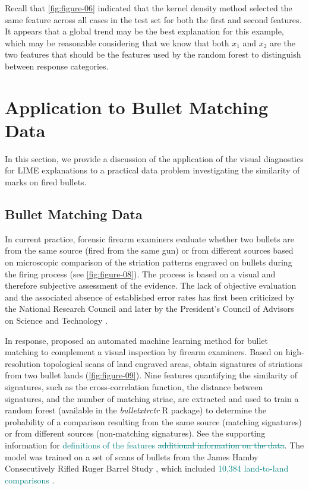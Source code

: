\documentclass[AMS,STIX2COL]{WileyNJD-v2}\usepackage[]{graphicx}\usepackage[]{color}
\newcommand{\kge}[1]{\textcolor{teal}{#1}}
\begin{document}
Recall that \autoref{fig:figure-06} indicated that the kernel density method selected the same feature across all cases in the test set for both the first and second features. It appears that a global trend may be the best explanation for this example, which may be reasonable considering that we know that both $x_1$ and $x_2$ are the two features that should be the features used by the random forest to distinguish between response categories.

\section{Application to Bullet Matching Data} \label{application}

In this section, we provide a discussion of the application of the visual diagnostics for LIME explanations to a practical data problem investigating the similarity of marks on fired bullets.

\subsection{Bullet Matching Data}







In current practice, forensic firearm examiners evaluate whether two bullets are from the same source (fired from the same gun) or from different sources based on microscopic comparison of the striation patterns engraved on bullets during the firing process (see \autoref{fig:figure-08}). The process is based on a visual and therefore subjective assessment of the evidence. The lack of objective evaluation and the associated absence of established error rates has first been criticized by the National Research Council \cite{nrc:2009} and later by the President's Council of Advisors on Science and Technology \cite{pcast:2016}.

In response, \citet{hare:2017} proposed an automated machine learning method for bullet matching to complement a visual inspection by firearm examiners. Based on high-resolution topological scans of land engraved areas, \citet{hare:2017} obtain signatures of striations from two bullet lands (\autoref{fig:figure-09}). Nine features quantifying the similarity of signatures, such as the cross-correlation function, the distance between signatures, and the number of matching striae, are extracted and used to train a random forest (available in the \emph{bulletxtrctr} R package) to determine the probability of a comparison resulting from the same source (matching signatures) or from different sources (non-matching signatures). See the supporting information for \kge{definitions of the features \sout{additional information on the data}}. The model was trained on a set of scans of bullets from the James Hamby Consecutively Rifled Ruger Barrel Study \citep{hamby:2009}, which included \kge{10,384 land-to-land comparisons \citet{hare:2017}}.
\end{document}
